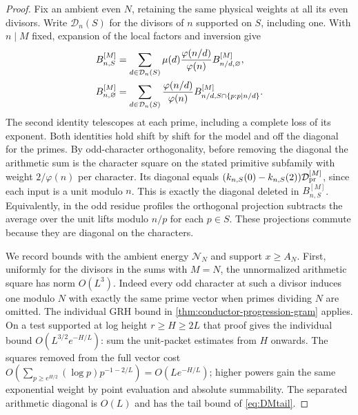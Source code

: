 \documentclass[11pt,a4paper]{article}
\numberwithin{equation}{section}
\begin{document}
\begin{proof}
Fix an ambient even $N$, retaining the same physical weights at
all its even divisors. Write $\mathcal D_n(S)$ for the divisors
of $n$ supported on $S$, including one. With $n\mid M$ fixed,
expansion of the local factors and inversion give
\begin{align}
 B_{n,S}^{[M]}&=\sum_{d\in\mathcal D_n(S)}
   \mu(d)\frac{\varphi(n/d)}{\varphi(n)}B_{n/d,\varnothing}^{[M]},
       \notag\\
 B_{n,\varnothing}^{[M]}&=\sum_{d\in\mathcal D_n(S)}
   \frac{\varphi(n/d)}{\varphi(n)}
          B_{n/d,S\cap\{p:p\mid n/d\}}^{[M]} .
 \label{eq:physical-primitive-inversion}
\end{align}
The second identity telescopes at each prime, including a complete
loss of its exponent. Both identities hold shift by shift for the
model and off the diagonal for the primes. By odd-character
orthogonality, before removing the diagonal the arithmetic sum
is the character square on the stated primitive subfamily with
weight $2/\varphi(n)$ per character. Its diagonal equals
$(k_{n,S}(0)-k_{n,S}(2))\mathcal D_{\rm pr}^{[M]}$, since each
input is a unit modulo $n$. This is exactly the diagonal deleted
in $B_{n,S}^{[M]}$. Equivalently, in the odd residue profiles the
orthogonal projection subtracts the average over the unit lifts
modulo $n/p$ for each $p\in S$. These projections commute because
they are diagonal on the characters.

We record bounds with the ambient energy $\mathcal N_N$ and
support $x\ge A_N$. First, uniformly for the divisors in the sums
with $M=N$, the unnormalized arithmetic square has norm $O(L^3)$.
Indeed every odd character at such a divisor induces one modulo
$N$ with exactly the same prime vector when primes
dividing $N$ are omitted. The individual GRH bound in
\cref{thm:conductor-progression-gram} applies. On a test supported
at log height $r\ge H\ge 2L$ that proof gives the individual
bound $O(L^{3/2}e^{-H/L})$: sum the unit-packet estimates from
$H$ onwards. The squares removed from the full vector cost
$O(\sum_{p\ge e^{H/2}}(\log p)p^{-1-2/L})=O(Le^{-H/L})$;
higher powers gain the same exponential weight by point
evaluation and absolute summability. The separated arithmetic
diagonal is $O(L)$ and has the tail bound of \cref{eq:DMtail}.


\end{proof}
\end{document}
